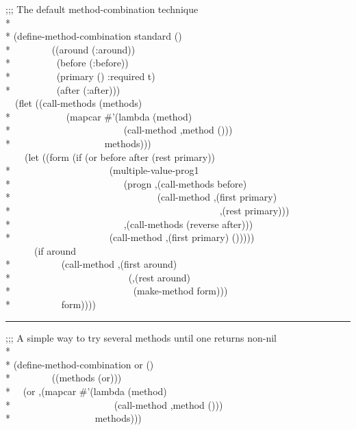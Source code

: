\begin{defmac}
\begin{lisp}
;;; The default method-combination technique \\*
\\*
(define-method-combination standard () \\*
~~~~~~~~((around (:around)) \\*
~~~~~~~~~(before (:before)) \\*
~~~~~~~~~(primary () :required t) \\*
~~~~~~~~~(after (:after))) \\
~~(flet ((call-methods (methods) \\*
~~~~~~~~~~~(mapcar \#'(lambda (method) \\*
~~~~~~~~~~~~~~~~~~~~~~~{\Xbq}(call-method ,method ())) \\*
~~~~~~~~~~~~~~~~~~~methods))) \\
~~~~(let ((form (if (or before after (rest primary)) \\*
~~~~~~~~~~~~~~~~~~~~{\Xbq}(multiple-value-prog1 \\*
~~~~~~~~~~~~~~~~~~~~~~~(progn ,{\Xatsign}(call-methods before) \\*
~~~~~~~~~~~~~~~~~~~~~~~~~~~~~~(call-method ,(first primary) \\*
~~~~~~~~~~~~~~~~~~~~~~~~~~~~~~~~~~~~~~~~~~~,(rest primary))) \\*
~~~~~~~~~~~~~~~~~~~~~~~,{\Xatsign}(call-methods (reverse after))) \\*
~~~~~~~~~~~~~~~~~~~~{\Xbq}(call-method ,(first primary) ())))) \\
~~~~~~(if around \\*
~~~~~~~~~~{\Xbq}(call-method ,(first around) \\*
~~~~~~~~~~~~~~~~~~~~~~~~(,{\Xatsign}(rest around) \\*
~~~~~~~~~~~~~~~~~~~~~~~~~(make-method form))) \\*
~~~~~~~~~~form))))
\end{lisp}
\hrule width 0pt\relax
\begin{lisp}
;;; A simple way to try several methods until one returns non-nil \\*
\\*
(define-method-combination or () \\*
~~~~~~~~((methods (or))) \\*
~~{\Xbq}(or ,{\Xatsign}(mapcar \#'(lambda (method) \\*
~~~~~~~~~~~~~~~~~~~~~{\Xbq}(call-method ,method ())) \\*
~~~~~~~~~~~~~~~~~methods))) \\

\end{lisp}
\end{defmac}

